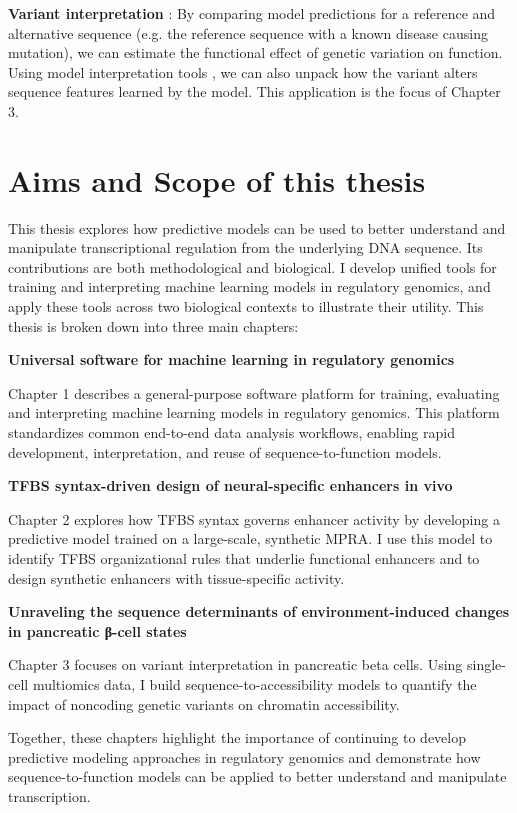 \begin{dissertationintroduction}
\textbf{Variant interpretation} \cite{Dey2020-lf}: By comparing model predictions for a reference and alternative sequence (e.g. the reference sequence with a known disease causing mutation), we can estimate the functional effect of genetic variation on function. Using model interpretation tools \cite{Shrikumar2017-og}, we can also unpack how the variant alters sequence features learned by the model. This application is the focus of Chapter 3.

\section{Aims and Scope of this thesis}

This thesis explores how predictive models can be used to better understand and manipulate transcriptional regulation from the underlying DNA sequence. Its contributions are both methodological and biological. I develop unified tools for training and interpreting machine learning models in regulatory genomics, and apply these tools across two biological contexts to illustrate their utility. This thesis is broken down into three main chapters:

\textbf{Universal software for machine learning in regulatory genomics}

Chapter 1 describes a general-purpose software platform for training, evaluating and interpreting machine learning models in regulatory genomics. This platform standardizes common end-to-end data analysis workflows, enabling rapid development, interpretation, and reuse of sequence-to-function models.

\textbf{TFBS syntax-driven design of neural-specific enhancers in vivo}

Chapter 2 explores how TFBS syntax governs enhancer activity by developing a predictive model trained on a large-scale, synthetic MPRA. I use this model to identify TFBS organizational rules that underlie functional enhancers and to design synthetic enhancers with tissue-specific activity.

\textbf{Unraveling the sequence determinants of environment-induced changes in pancreatic β-cell states}

Chapter 3 focuses on variant interpretation in pancreatic beta cells. Using single-cell multiomics data, I build sequence-to-accessibility models to quantify the impact of noncoding genetic variants on chromatin accessibility.

Together, these chapters highlight the importance of continuing to develop predictive modeling approaches in regulatory genomics and demonstrate how sequence-to-function models can be applied to better understand and manipulate transcription.

\end{dissertationintroduction}
